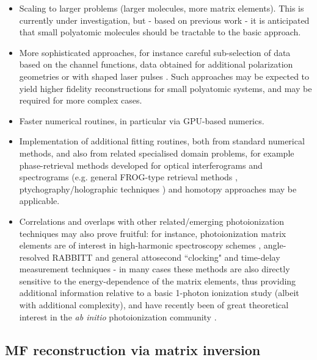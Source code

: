 \documentclass[10pt]{article}
\begin{document}
\begin{itemize}
\item Scaling to larger problems (larger molecules, more matrix elements). This is currently under investigation, but - based on previous work \cite{hockett2009RotationallyResolvedPhotoelectron, hockett2018QMP2} - it is anticipated that small polyatomic molecules should be tractable to the basic approach. 
\item More sophisticated approaches, for instance careful sub-selection of data based on the channel functions, data obtained for additional polarization geometries or with shaped laser pulses \cite{hockett2014CompletePhotoionizationExperiments, hockett2015CoherentControlPhotoelectron, hockett2015CompletePhotoionizationExperiments,hockett2018QMP1}. Such approaches may be expected to yield higher fidelity reconstructions for small polyatomic systems, and may be required for more complex cases.
\item Faster numerical routines, in particular via GPU-based numerics.
\item Implementation of additional fitting routines, both from standard numerical methods, and also from related specialised domain problems, for example phase-retrieval methods developed for optical interferograms and spectrograms (e.g. general FROG-type retrieval methods \cite{trebino2000FrequencyResolvedOpticalGating}, ptychography/holographic techniques \cite{Spangenberg2015b, Spangenberg2015c}) and homotopy \cite{Sommese2005} approaches may be applicable.
\item Correlations and overlaps with other related/emerging photoionization techniques may also prove fruitful: for instance, photoionization matrix elements are of interest in high-harmonic spectroscopy schemes \cite{Lock2012}, angle-resolved RABBITT \cite{hockett2017AngleresolvedRABBITTTheory,villeneuve2017CoherentImagingAttosecond} and general attosecond ``clocking" and time-delay measurement techniques - in many cases these methods are also directly sensitive to the energy-dependence of the matrix elements, thus providing additional information relative to a basic 1-photon ionization study (albeit with additional complexity), and have recently been of great theoretical interest in the \textit{ab initio} photoionization community \cite{Feist2014,benda2022AnalysisRABITTTime}.

\end{itemize}

\subsection{MF reconstruction via matrix inversion\label{sec:Matrix-inversion-example}}
\end{document}
